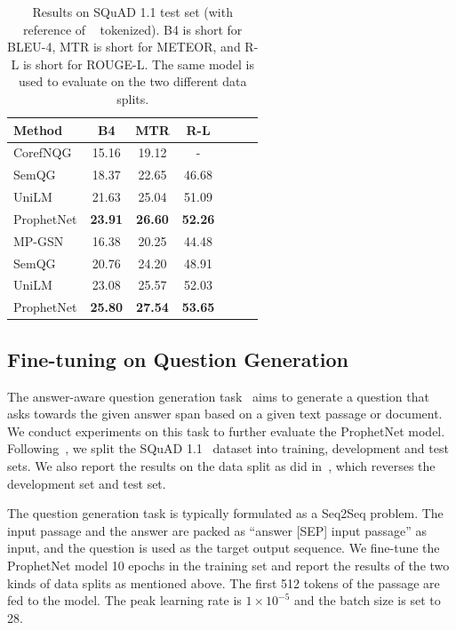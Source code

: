 \documentclass[11pt,a4paper]{article}
\begin{document}
\begin{table}[th] 
\small
\begin{center}
  \begin{tabular}{lcccccl} 
    \toprule
    Method & B4 & MTR & R-L \\
    \midrule
 CorefNQG\scriptsize{~\cite{du2018harvesting}} & 15.16 & 19.12 & - \\
 SemQG\scriptsize{~\cite{zhang2019addressing}} & 18.37 & 22.65 & 46.68 \\
 UniLM\scriptsize{~\cite{dong2019unified}} & 21.63    &25.04&   51.09\\
  ProphetNet &   \textbf{23.91}  & \textbf{26.60}   & \textbf{52.26}\\ \hline
 MP-GSN\scriptsize{~\cite{zhao2018paragraph}} & 16.38 & 20.25 & 44.48 \\
  SemQG\scriptsize{~\cite{zhang2019addressing}} & 20.76 & 24.20 & 48.91 \\
 UniLM\scriptsize{~\cite{dong2019unified}} & 23.08    &25.57&   52.03\\
 ProphetNet &   \textbf{25.80}  & \textbf{27.54}   & \textbf{53.65}\\
  \bottomrule
\end{tabular}
\end{center}
\caption{Results on SQuAD 1.1 test set (with reference of ~\citet{du2017learning} tokenized). B4 is short for BLEU-4, MTR is short for METEOR, and R-L is short for ROUGE-L. The same model is used to evaluate on the two different data splits.} \label{tab:squad-recover}
\end{table}


\subsection{Fine-tuning on Question Generation}\label{sec:exp3}
The answer-aware question generation task~\cite{zhou2017neural} aims to generate a question that asks towards the given answer span based on a given text passage or document.
We conduct experiments on this task to further evaluate the ProphetNet model.  Following~\citet{du2017learning}, we split the SQuAD 1.1~\cite{rajpurkar2016squad} dataset into training, development and test sets. We also report the results on the data split as did in~\citet{zhao2018paragraph}, which reverses the development set and test set.

The question generation task is typically formulated as a Seq2Seq problem. 
The input passage and the answer are packed as ``answer [SEP] input passage'' as input, and the question is used as the target output sequence.
We fine-tune the ProphetNet model 10 epochs in the training set and report the results of the two kinds of data splits as mentioned above. 
The first 512 tokens of the passage are fed to the model. 
The peak learning rate is $1 \times 10^{-5}$ and the batch size is set to 28.
\end{document}
